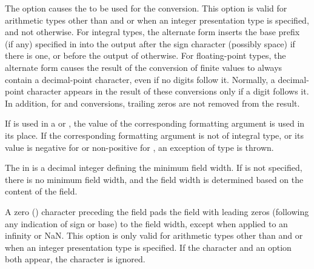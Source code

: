\pnum
The \tcode{\#} option causes the
to be used for the conversion.
This option is valid for arithmetic types other than
 and 
or when an integer presentation type is specified, and not otherwise.
For integral types,
the alternate form inserts the
base prefix (if any) specified in 
into the output after the sign character (possibly space) if there is one, or
before the output of  otherwise.
For floating-point types,
the alternate form causes the result of the conversion of finite values
to always contain a decimal-point character,
even if no digits follow it.
Normally, a decimal-point character appears in the result of these
conversions only if a digit follows it.
In addition, for  and  conversions,
trailing zeros are not removed from the result.

\pnum
If  is used in
a  or ,
the value of the corresponding formatting argument is used in its place.
If the corresponding formatting argument is not of integral type, or
its value is
negative for  or
non-positive for ,
an exception of type  is thrown.

\pnum
The  in
 is a decimal integer defining the minimum field width.
If  is not specified,
there is no minimum field width, and
the field width is determined based on the content of the field.

\pnum
A zero () character
preceding the  field
pads the field with leading zeros (following any indication of sign or base)
to the field width,
except when applied to an infinity or NaN.
This option is only valid for
arithmetic types other than  and 
or when an integer presentation type is specified.
If the  character and an  option both appear,
the  character is ignored.
\begin{example}
\end{example}

